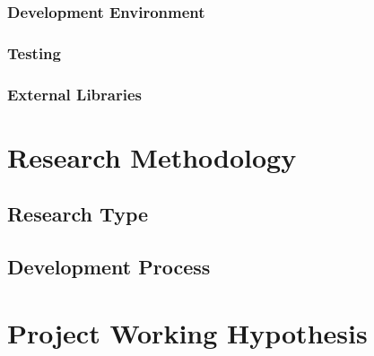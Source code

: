 \subsubsection{Development Environment}

\subsubsection{Testing}

\subsubsection{External Libraries}

\section{Research Methodology}

\subsection{Research Type}

\subsection{Development Process}

\section{Project Working Hypothesis}



